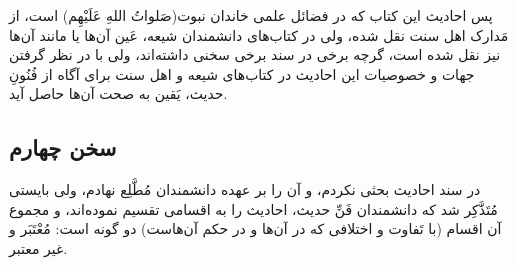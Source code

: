 پس احادیث این کتاب که در فضائل علمی خاندان نبوت(صَلواتُ اللهِ عَلَیْهِم) است،
از مَدارک اهل سنت نقل شده، ولی در کتاب‌های دانشمندان شیعه، عَین آن‌ها یا
مانند آن‌ها نیز نقل شده است، گرچه برخی در سند برخی سخنی داشته‌اند، ولی
با در نظر گرفتن جهات و خصوصیات این احادیث در کتاب‌های شیعه و اهل سنت
برای آگاه از فُنُونِ حدیث، یَقین به صحت آن‌ها حاصل آید.

\subsection*{سخن چهارم}

در سند احادیث بحثی نکردم، و آن را بر عهده دانشمندان مُطَّلِع نهادم، ولی
بایستی مُتَذَّکِر شد که دانشمندان فَنِّ حدیث، احادیث را به اقسامی تقسیم
نموده‌اند، و مجموع آن اقسام (با تَفاوت و اختلافی که در آن‌ها و در حکم
آن‌هاست) دو گونه است: مُعْتَبَر و غیر معتبر.
